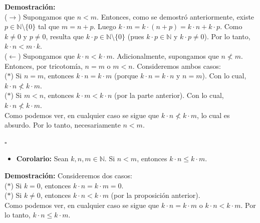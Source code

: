 \documentclass[10 pt]{article}
\begin{document}
\Large{\textbf{Demostración:} \\

($\rightarrow$) Supongamos que $n<m$. Entonces, como se demostró anteriormente, existe $p \in \mathbb N \setminus \{0\}$ tal que $m=n+p$. Luego $k \cdot m=k \cdot (n+p)=k \cdot n+k \cdot p$. Como $k \neq 0$ y $p \neq 0$, resulta que $k \cdot p \in \mathbb N \setminus \{0\}$ (pues $k \cdot p \in \mathbb N$ y $k \cdot p \neq 0$). Por lo tanto, $k \cdot n<m \cdot k$. \\

($\leftarrow$) Supongamos que $k \cdot n<k \cdot m$. Adicionalmente, supongamos que $n \nless m$. Entonces, por tricotomía, $n=m$ o $m<n$. Consideremos ambos casos: \\

($\ast$) Si $n=m$, entonces $k \cdot n=k \cdot m$ (porque $k \cdot n=k \cdot n$ y $n=m$). Con lo cual, $k \cdot n \nless k \cdot m$. \\

($\ast$) Si $m<n$, entonces $k \cdot m<k \cdot n$ (por la parte anterior). Con lo cual, $k \cdot n \nless k \cdot m$. \\

Como podemos ver, en cualquier caso se sigue que $k \cdot n \nless k \cdot m$, lo cual es absurdo. Por lo tanto, necesariamente $n<m$.} \\

\begin{flushright}
    $\square$
\end{flushright}

\begin{itemize}
    \item \Large{\textbf{Corolario:} Sean $k,n,m \in \mathbb N$. Si $n<m$, entonces $k \cdot n \leq k \cdot m$.} \\
\end{itemize}

\Large{\textbf{Demostración:} Consideremos dos casos: \\

($\ast$) Si $k=0$, entonces $k \cdot n=k \cdot m=0$. \\

($\ast$) Si $k \neq 0$, entonces $k \cdot n<k \cdot m$ (por la proposición anterior). \\

Como podemos ver, en cualquier caso se sigue que $k \cdot n=k \cdot m$ o $k \cdot n<k \cdot m$. Por lo tanto, $k \cdot n \leq k \cdot m$.} \\
\end{document}
